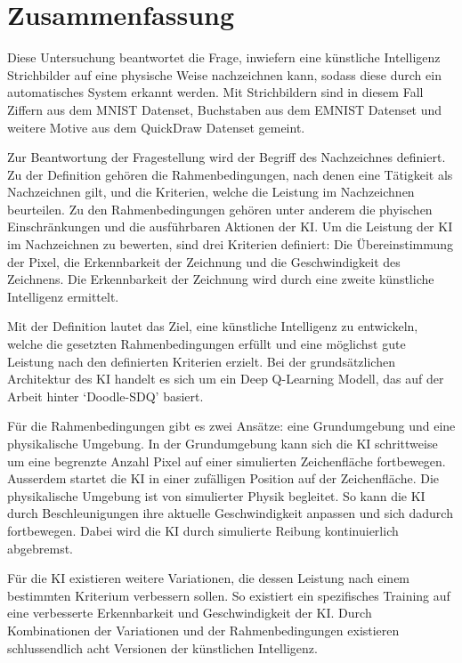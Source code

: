 \chapter{Zusammenfassung}\label{zusammenfassung}
Diese Untersuchung beantwortet die Frage, inwiefern eine künstliche Intelligenz
Strichbilder auf eine physische Weise nachzeichnen kann, sodass diese durch ein
automatisches System erkannt werden. Mit Strichbildern sind in diesem
Fall Ziffern aus dem MNIST Datenset, Buchstaben aus dem EMNIST Datenset und
weitere Motive aus dem QuickDraw Datenset gemeint. 

Zur Beantwortung der Fragestellung wird der Begriff des Nachzeichnes definiert.
Zu der Definition gehören die Rahmenbedingungen, nach denen eine Tätigkeit als
Nachzeichnen gilt, und die Kriterien, welche die Leistung im Nachzeichnen
beurteilen. Zu den Rahmenbedingungen gehören unter anderem die phyischen
Einschränkungen und die ausführbaren Aktionen der KI. Um die Leistung der KI im
Nachzeichnen zu bewerten, sind drei Kriterien definiert: Die Übereinstimmung der
Pixel, die Erkennbarkeit der Zeichnung und die Geschwindigkeit des Zeichnens.
Die Erkennbarkeit der Zeichnung wird durch eine zweite künstliche Intelligenz
ermittelt.

Mit der Definition lautet das Ziel, eine künstliche Intelligenz zu entwickeln, welche die gesetzten
Rahmenbedingungen erfüllt und eine möglichst gute Leistung nach den definierten
Kriterien erzielt. Bei der grundsätzlichen Architektur des KI handelt es sich um
ein Deep Q-Learning Modell, das auf der Arbeit hinter `Doodle-SDQ'
\cite{zhou_learning_2018} basiert.

Für die Rahmenbedingungen gibt es zwei Ansätze: eine Grundumgebung und eine
physikalische Umgebung. In der Grundumgebung kann sich die KI schrittweise um
eine begrenzte Anzahl Pixel auf einer simulierten Zeichenfläche fortbewegen.
Ausserdem startet die KI in einer zufälligen Position auf der Zeichenfläche. Die
physikalische Umgebung ist von simulierter Physik begleitet. So kann die KI
durch Beschleunigungen ihre aktuelle Geschwindigkeit anpassen und sich dadurch
fortbewegen. Dabei wird die KI durch simulierte Reibung kontinuierlich
abgebremst. 

Für die KI existieren weitere Variationen, die dessen Leistung nach einem
bestimmten Kriterium verbessern sollen. So existiert ein spezifisches Training
auf eine verbesserte Erkennbarkeit und Geschwindigkeit der KI. Durch
Kombinationen der Variationen und der Rahmenbedingungen existieren
schlussendlich acht Versionen der künstlichen Intelligenz.

